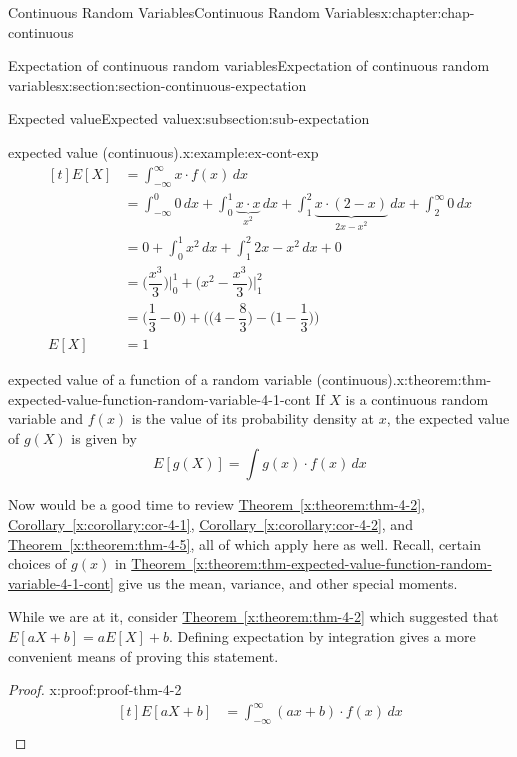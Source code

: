 \documentclass[oneside,10pt,]{book}
\newcommand{\xreffont}{\relax}
\numberwithin{equation}{section}
\newcommand{\amp}{&}
\begin{document}
\begin{chapterptx}{Continuous Random Variables}{}{Continuous Random Variables}{}{}{x:chapter:chap-continuous}
\begin{sectionptx}{Expectation of continuous random variables}{}{Expectation of continuous random variables}{}{}{x:section:section-continuous-expectation}
\begin{subsectionptx}{Expected value}{}{Expected value}{}{}{x:subsection:sub-expectation}
\begin{example}{expected value (continuous).}{x:example:ex-cont-exp}
\begin{equation*}
\begin{aligned}[t]
E[X] \amp = \int_{-\infty}^\infty x\cdot f(x)\,dx\\
\amp = \int_{-\infty}^0 0\,dx + \int_{0}^1 \underbrace{x\cdot
x}_{x^2}\,dx + \int_{1}^2 \underbrace{x\cdot(2-x)}_{2x-x^2}\,dx +
\int_2^{\infty} 0\,dx\\
\amp = 0 + \int_{0}^1 x^2\,dx + \int_{1}^2 2x-x^2\,dx + 0\\
\amp = \Big(\dfrac{x^3}{3}\Big)\Big|_0^1 +
\Big(x^2-\dfrac{x^3}{3}\Big)\Big|_1^2\\
\amp = \Big(\dfrac{1}{3} - 0\Big) + \Big(\Big(4-\dfrac{8}{3}\Big) -
\Big(1-\dfrac{1}{3}\Big)\Big)\\ 
E[X] \amp = 1
\end{aligned}
\end{equation*}
\end{example}
\begin{theorem}{expected value of a function of a random variable (continuous).}{}{x:theorem:thm-expected-value-function-random-variable-4-1-cont}%
If \(X\) is a continuous random variable and \(f(x)\) is the value of its probability density at \(x\), the expected value of \(g(X)\) is given by%
\begin{equation*}
E[g(X)] = \int g(x)\cdot f(x)\,dx
\end{equation*}
%
\end{theorem}
Now would be a good time to review \hyperref[x:theorem:thm-4-2]{Theorem~{\xreffont\ref{x:theorem:thm-4-2}}}, \hyperref[x:corollary:cor-4-1]{Corollary~{\xreffont\ref{x:corollary:cor-4-1}}}, \hyperref[x:corollary:cor-4-2]{Corollary~{\xreffont\ref{x:corollary:cor-4-2}}}, and \hyperref[x:theorem:thm-4-5]{Theorem~{\xreffont\ref{x:theorem:thm-4-5}}}, all of which apply here as well. Recall, certain choices of \(g(x)\) in \hyperref[x:theorem:thm-expected-value-function-random-variable-4-1-cont]{Theorem~{\xreffont\ref{x:theorem:thm-expected-value-function-random-variable-4-1-cont}}} give us the mean, variance, and other special moments.%
\par
While we are at it, consider \hyperref[x:theorem:thm-4-2]{Theorem~{\xreffont\ref{x:theorem:thm-4-2}}} which suggested that \(E[aX+b] = aE[X]+b\). Defining expectation by integration gives a more convenient means of proving this statement. \begin{proof}{}{x:proof:proof-thm-4-2}
%
\begin{equation*}
\begin{aligned}[t]
E[aX+b] \amp = \int_{-\infty}^\infty (ax+b)\cdot f(x)\,dx\\

\end{aligned}
\end{equation*}
\end{proof}
\end{subsectionptx}
\end{sectionptx}
\end{chapterptx}
\end{document}
